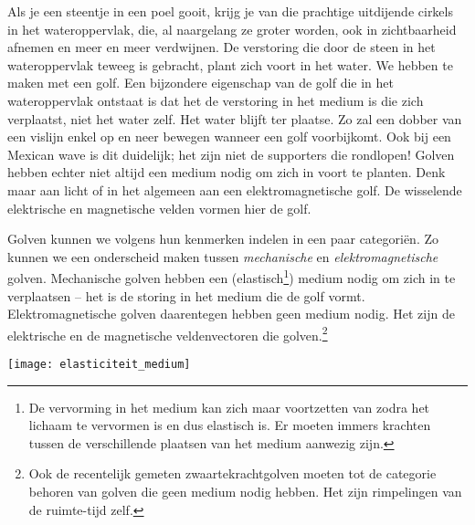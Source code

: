 \documentclass{ximera}
\begin{document}
	\author{Bart Lambregs}
    \xmsource



	Als je een steentje in een poel gooit, krijg je van die prachtige uitdijende cirkels in het wateroppervlak, die, al naargelang ze groter worden, ook in zichtbaarheid afnemen en meer en meer verdwijnen. De verstoring die door de steen in het wateroppervlak teweeg is gebracht, plant zich voort in het water. We hebben te maken met een golf.
	Een bijzondere eigenschap van de golf die in het wateroppervlak ontstaat is dat het de verstoring in het medium is die zich verplaatst, niet het water zelf. Het water blijft ter plaatse. Zo zal een dobber van een vislijn enkel op en neer bewegen wanneer een golf voorbijkomt. Ook bij een Mexican wave is dit duidelijk; het zijn niet de supporters die rondlopen!
	Golven hebben echter niet altijd een medium nodig om zich in voort te planten. Denk maar aan licht of in het algemeen aan een elektromagnetische golf. De wisselende elektrische en magnetische velden vormen hier de golf.
	
	
	
	
	Golven kunnen we volgens hun kenmerken indelen in een paar categori\"en. Zo kunnen we een onderscheid maken tussen \emph{mechanische} en \emph{elektromagnetische} golven. Mechanische golven hebben een (elastisch\footnote{De vervorming in het medium kan zich maar voortzetten van zodra het lichaam te vervormen is en dus elastisch is. Er moeten immers krachten tussen de verschillende plaatsen van het medium aanwezig zijn.}) medium nodig om zich in te verplaatsen -- het is de storing in het medium die de golf vormt. Elektromagnetische golven daarentegen hebben geen medium nodig. Het zijn de elektrische en de magnetische veldenvectoren die golven.\footnote{Ook de recentelijk gemeten zwaartekrachtgolven moeten tot de categorie behoren van golven die geen medium nodig hebben. Het zijn rimpelingen van de ruimte-tijd zelf.}
	\begin{image}
	
	\texttt{[image: elasticiteit\_medium]}
	\end{image}
	
\end{document}
